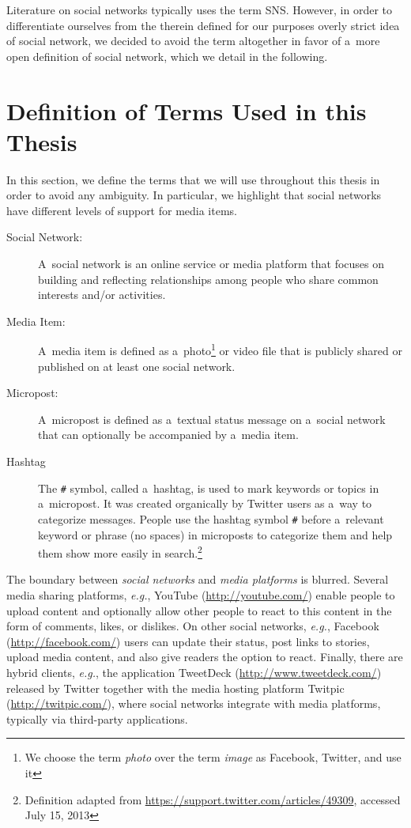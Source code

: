 Literature on social networks typically uses the term SNS.
However, in order to differentiate ourselves
from the therein defined for our purposes overly strict
idea of social network,
we decided to avoid the term altogether in favor of a~more open
definition of social network,
which we detail in the following.

\section{Definition of Terms Used in this Thesis}
\label{sec:definition}

In this section, we define the terms
that we will use throughout this thesis
in order to avoid any ambiguity.
In particular, we highlight that social networks have
different levels of support for media items.

\begin{description}
  \item[Social Network:]
       A~social network is an online service or media platform
       that focuses on building and reflecting
       relationships among people
       who share common interests and/or activities.
  \item[Media Item:]
       A~media item is defined as
       a~photo\footnote{We choose the term \emph{photo}
       over the term \emph{image} as
       Facebook, Twitter, and \googleplus use it}
       or video file that is publicly shared or published
       on at least one social network.
  \item[Micropost:]
       A~micropost is defined as a~textual status message
        on a~social network
       that can optionally be accompanied by a~media item.
  \item[Hashtag] The \texttt{\#} symbol, called a~hashtag,
       is used to mark keywords or topics in a~micropost.
       It was created organically by Twitter users
       as a~way to categorize messages.
       People use the hashtag symbol \texttt{\#} before a~relevant keyword
       or phrase (no spaces) in microposts to categorize them
       and help them show more easily in
       search.\footnote{Definition adapted from
       \url{https://support.twitter.com/articles/49309},
       accessed July 15, 2013}
\end{description}

The boundary between \emph{social networks} and
\emph{media platforms} is blurred.
Several media sharing platforms, \emph{e.g.},
YouTube (\url{http://youtube.com/})
enable people to upload content
and optionally allow other people to react
to this content in the form of comments, likes, or dislikes.
On other social networks, \emph{e.g.},
Facebook (\url{http://facebook.com/})
users can update their status, post links to stories,
upload media content, and also give readers the option to react.
Finally, there are hybrid clients, \emph{e.g.},
the application TweetDeck (\url{http://www.tweetdeck.com/})
released by Twitter together with the media hosting platform
Twitpic (\url{http://twitpic.com/}),
where social networks integrate with media platforms,
typically via third-party applications.

